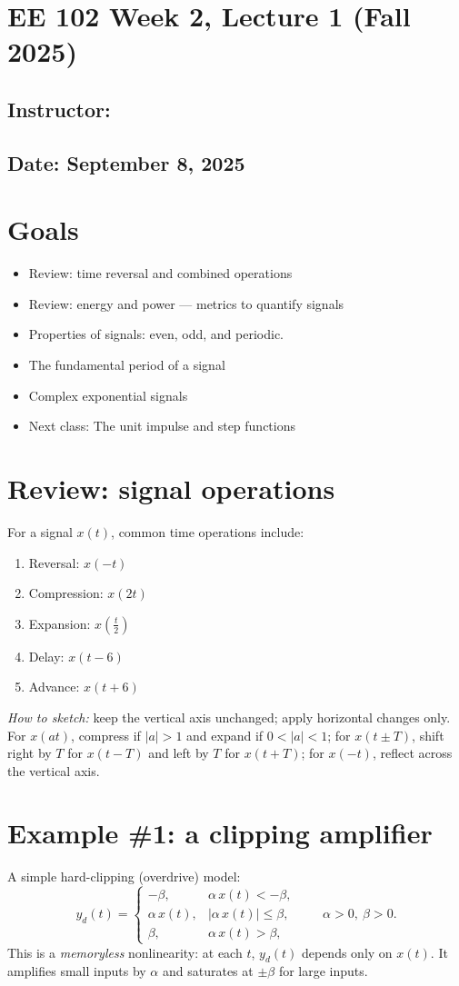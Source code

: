 \documentclass{ee102_notes}
\renewcommand{\releasedate}{September 8, 2025}
\begin{document}
\section*{EE 102 Week 2, Lecture 1 (Fall 2025)}
\subsection*{Instructor: \instructor}
\subsection*{Date: \releasedate}
\section{Goals}
\begin{itemize}
    \item Review: time reversal and combined operations
    \item Review: energy and power --- metrics to quantify signals
    \item Properties of signals: even, odd, and periodic.
    \item The fundamental period of a signal
    \item Complex exponential signals
    \item Next class: The unit impulse and step functions
\end{itemize}

\section{Review: signal operations}
For a signal $x(t)$, common time operations include:
\begin{enumerate}
    \item Reversal: $x(-t)$
    \item Compression: $x(2t)$
    \item Expansion: $x\!\left(\tfrac{t}{2}\right)$
    \item Delay: $x(t-6)$
    \item Advance: $x(t+6)$
\end{enumerate}

\textit{How to sketch:} keep the vertical axis unchanged; apply horizontal changes only. For $x(at)$, compress if $|a|>1$ and expand if $0<|a|<1$; for $x(t\pm T)$, shift right by $T$ for $x(t-T)$ and left by $T$ for $x(t+T)$; for $x(-t)$, reflect across the vertical axis.

\section{Example \#1: a clipping amplifier}
A simple hard-clipping (overdrive) model:
\[
y_d(t)=
\begin{cases}
-\beta, & \alpha\,x(t)<-\beta,\\[2pt]
\alpha\,x(t), & |\alpha\,x(t)|\le \beta,\\[2pt]
\beta, & \alpha\,x(t)>\beta,
\end{cases}
\qquad \alpha>0,\ \beta>0.
\]
This is a \emph{memoryless} nonlinearity: at each $t$, $y_d(t)$ depends only on $x(t)$. It amplifies small inputs by $\alpha$ and saturates at $\pm\beta$ for large inputs.
\end{document}
